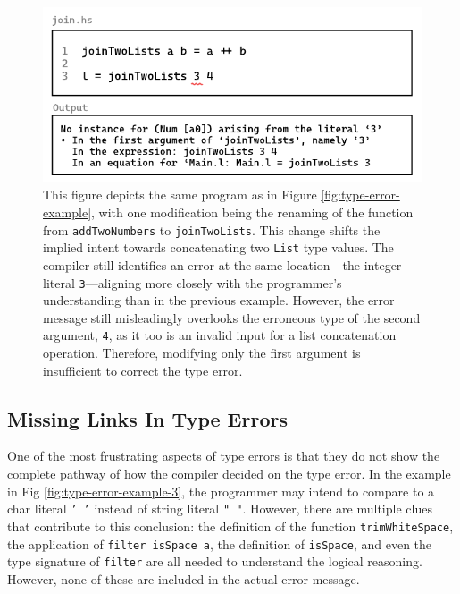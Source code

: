 \begin{figure}[hbt]
  \includegraphics[width=\linewidth]{TypeErrorExample2}
  \caption{
    \label{fig:type-error-example-2}
    This figure depicts the same program as in Figure \ref{fig:type-error-example}, with one modification being the renaming of the function from \texttt{addTwoNumbers} to \texttt{joinTwoLists}. This change shifts the implied intent towards concatenating two \texttt{List} type values. The compiler still identifies an error at the same location—the integer literal \texttt{3}—aligning more closely with the programmer's understanding than in the previous example. However, the error message still misleadingly overlooks the erroneous type of the second argument, \texttt{4}, as it too is an invalid input for a list concatenation operation. Therefore, modifying only the first argument is insufficient to correct the type error.
    }
\end{figure}

\subsection{Missing Links In Type Errors}
\label{subsec:missing-link}

One of the most frustrating aspects of type errors is that they do not show the complete pathway of how the compiler decided on the type error. In the example in Fig \ref{fig:type-error-example-3}, the programmer may intend to compare to a char literal \texttt{' '} instead of string literal \texttt{" "}. However, there are multiple clues that contribute to this conclusion: the definition of the function \texttt{trimWhiteSpace}, the application of \texttt{filter isSpace a}, the definition of \texttt{isSpace}, and even the type signature of \texttt{filter} are all needed to understand the logical reasoning. However, none of these are included in the actual error message.


